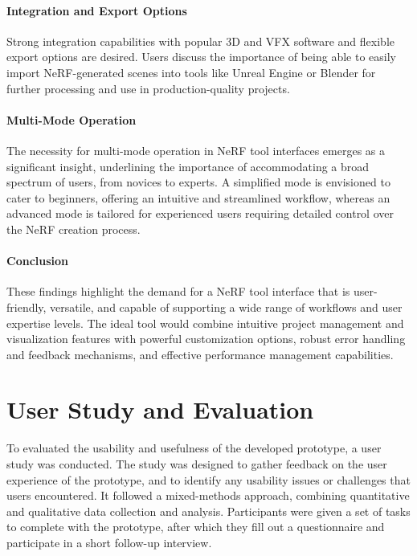 \paragraph{Integration and Export Options}

Strong integration capabilities with popular 3D and VFX software and flexible export options are desired. 
Users discuss the importance of being able to easily import NeRF-generated scenes into tools like Unreal Engine or Blender for further processing and use in production-quality projects​​.

\paragraph{Multi-Mode Operation}

The necessity for multi-mode operation in NeRF tool interfaces emerges as a significant insight, underlining the importance of accommodating a broad spectrum of users, from novices to experts. 
A simplified mode is envisioned to cater to beginners, offering an intuitive and streamlined workflow, whereas an advanced mode is tailored for experienced users requiring detailed control over the NeRF creation process. 

\paragraph{Conclusion}

These findings highlight the demand for a NeRF tool interface that is user-friendly, versatile, and capable of supporting a wide range of workflows and user expertise levels. 
The ideal tool would combine intuitive project management and visualization features with powerful customization options, robust error handling and feedback mechanisms, and effective performance management capabilities.


\section{User Study and Evaluation}
\label{sec:methodology:study}

To evaluated the usability and usefulness of the developed prototype, a user study was conducted. 
The study was designed to gather feedback on the user experience of the prototype, and to identify any usability issues or challenges that users encountered.
It followed a mixed-methods approach, combining quantitative and qualitative data collection and analysis. 
Participants were given a set of tasks to complete with the prototype, after which they fill out a questionnaire and participate in a short follow-up interview.

